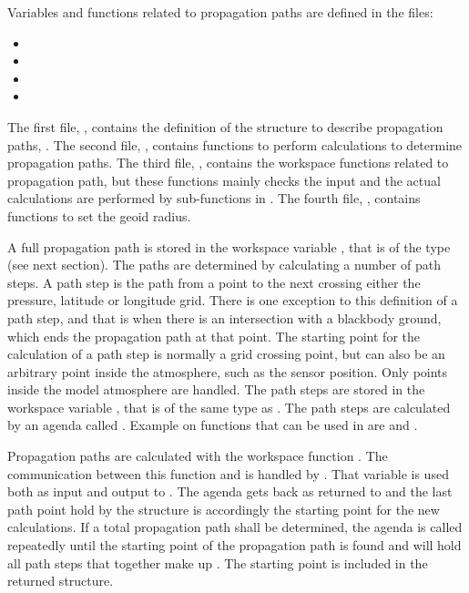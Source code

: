Variables and functions related to propagation paths are defined in the files:
\begin{itemize}
\item {}
\item {}
\item {}
\item {}
\end{itemize}
The first file, , contains the definition of the
structure to describe propagation paths, . The
second file, , contains functions to perform
calculations to determine propagation paths. The third file,
, contains the workspace functions related to
propagation path, but these functions mainly checks the input and the
actual calculations are performed by sub-functions in
. The fourth file, ,
contains functions to set the geoid radius.




\label{sec:ppath:approach}

A full propagation path is stored in the workspace variable
, that is of the type  (see next
section). The paths are determined by calculating a number of path
steps. A path step is the path from a point to the next crossing
either the pressure, latitude or longitude grid. There is one
exception to this definition of a path step, and that is when there
is an intersection with a blackbody ground, which ends the propagation
path at that point. The starting point for the calculation of a path
step is normally a grid crossing point, but can also be an arbitrary
point inside the atmosphere, such as the sensor position. Only points
inside the model atmosphere are handled. The path steps are stored in
the workspace variable , that is of the same
type as . The path steps are calculated by an agenda
called . Example on functions that can
be used in  are
 and
.

Propagation paths are calculated with the workspace function
. The communication between this function and
 is handled by .
That variable is used both as input and output to
.  The agenda gets back
 as returned to  and the
last path point hold by the structure is accordingly the starting
point for the new calculations. If a total propagation path shall be
determined, the agenda is called repeatedly until the starting point
of the propagation path is found and  will hold
all path steps that together make up . The starting
point is included in the returned structure.

